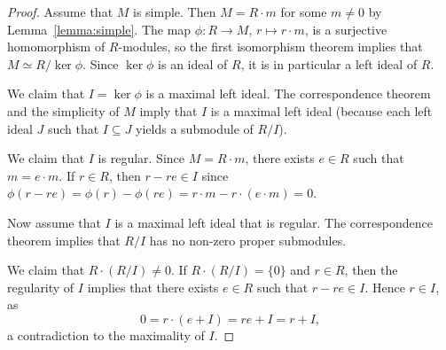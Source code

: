 \begin{proof}
	Assume that $M$ is simple. Then $M=R\cdot m$ for some $m\ne0$ by 
	Lemma~\ref{lemma:simple}. The map $\phi\colon R\to M$, $r\mapsto r\cdot m$, 
	is a surjective homomorphism of $R$-modules, 
	so the first isomorphism theorem implies that 
	$M\simeq R/\ker\phi$. Since $\ker\phi$ is an ideal of $R$, it is 
	in particular a left ideal of $R$. 
	
	We claim that $I=\ker\phi$ is a maximal left ideal. 
	The correspondence theorem 
	and the simplicity of $M$ imply that $I$ is a 
	maximal left ideal (because each left ideal $J$ such that 
	$I\subseteq J$ yields a submodule of $R/I$).

	We claim that $I$ is regular. Since $M=R\cdot m$, there exists $e\in R$ such that $m=e\cdot m$. If
	$r\in R$, then $r-re\in I$ since 
	$\phi(r-re)=\phi(r)-\phi(re)=r\cdot m-r\cdot (e\cdot m)=0$.

    Now assume that $I$ is a maximal left ideal that is regular. 
    The correspondence theorem implies that 
    $R/I$ has no non-zero proper submodules. 
    
    We claim that 
    $R\cdot (R/I)\ne0$. If $R\cdot (R/I)=\{0\}$ and $r\in R$, then 
    the regularity of $I$ implies that 
    there exists $e\in R$ such that $r-re\in I$. Hence $r\in I$, as  
	\[
	0=r\cdot (e+I)=re+I=r+I,
	\]
	a contradiction to the maximality of $I$. 
\end{proof}


